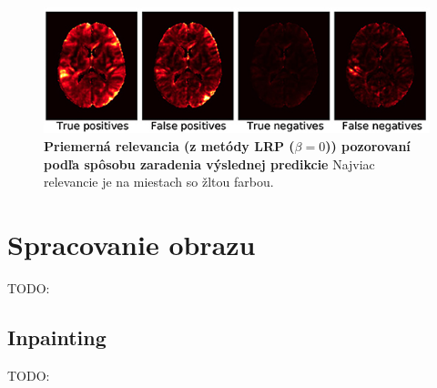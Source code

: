 
\begin{figure}[h!]
\centering
\includegraphics[scale=0.4]{assets/images/lrp_alzheimer.png}
\caption{\textbf{Priemerná relevancia (z metódy LRP ($\beta = 0$)) pozorovaní podľa spôsobu zaradenia výslednej predikcie}
Najviac relevancie je na miestach so žltou farbou. \cite{bohle2019layer}
}
\label{fig:lrp_alzheimer}
\end{figure}

\section{Spracovanie obrazu \label{cap:image_processing}}

TODO:

\subsection{Inpainting}

TODO:




